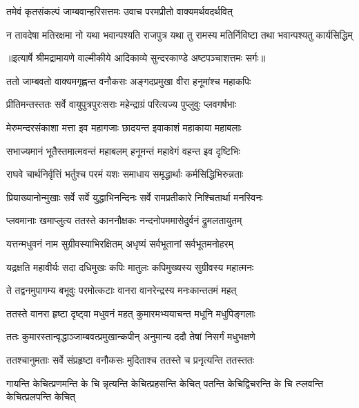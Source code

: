 \twolineshloka
{तमेवं कृतसंकल्पं जाम्बवान्हरिसत्तमः}
{उवाच परमप्रीतो वाक्यमर्थवदर्थवित्} %

\fourlineindentedshloka
{न तावदेषा मतिरक्षमा नो}
{ यथा भवान्पश्यति राजपुत्र}
{यथा तु रामस्य मतिर्निविष्टा}
{ तथा भवान्पश्यतु कार्यसिद्धिम्} %


{॥इत्यार्षे श्रीमद्रामायणे वाल्मीकीये आदिकाव्ये सुन्दरकाण्डे अष्टपञ्चाशत्तमः सर्गः॥}


\twolineshloka
{ततो जाम्बवतो वाक्यमगृह्णन्त वनौकसः}
{अङ्गदप्रमुखा वीरा हनूमांश्च महाकपिः} %

\twolineshloka
{प्रीतिमन्तस्ततः सर्वे वायुपुत्रपुरःसराः}
{महेन्द्राग्रं परित्यज्य पुप्लुवुः प्लवगर्षभाः} %

\twolineshloka
{मेरुमन्दरसंकाशा मत्ता इव महागजाः}
{छादयन्त इवाकाशं महाकाया महाबलाः} %

\twolineshloka
{सभाज्यमानं भूतैस्तमात्मवन्तं महाबलम्}
{हनूमन्तं महावेगं वहन्त इव दृष्टिभिः} %

\twolineshloka
{राघवे चार्थनिर्वृत्तिं भर्तुश्च परमं यशः}
{समाधाय समृद्धार्थाः कर्मसिद्धिभिरुन्नताः} %

\twolineshloka
{प्रियाख्यानोन्मुखाः सर्वे सर्वे युद्धाभिनन्दिनः}
{सर्वे रामप्रतीकारे निश्चितार्था मनस्विनः} %

\twolineshloka
{प्लवमानाः खमाप्लुत्य ततस्ते काननौक्षकः}
{नन्दनोपममासेदुर्वनं द्रुमलतायुतम्} %

\twolineshloka
{यत्तन्मधुवनं नाम सुग्रीवस्याभिरक्षितम्}
{अधृष्यं सर्वभूतानां सर्वभूतमनोहरम्} %

\twolineshloka
{यद्रक्षति महावीर्यः सदा दधिमुखः कपिः}
{मातुलः कपिमुख्यस्य सुग्रीवस्य महात्मनः} %

\twolineshloka
{ते तद्वनमुपागम्य बभूवुः परमोत्कटाः}
{वानरा वानरेन्द्रस्य मनःकान्ततमं महत्} %

\twolineshloka
{ततस्ते वानरा हृष्टा दृष्ट्वा मधुवनं महत्}
{कुमारमभ्ययाचन्त मधूनि मधुपिङ्गलाः} %

\twolineshloka
{ततः कुमारस्तान्वृद्धाञ्जाम्बवत्प्रमुखान्कपीन्}
{अनुमान्य ददौ तेषां निसर्गं मधुभक्षणे} %

\twolineshloka
{ततश्चानुमताः सर्वे संप्रहृष्टा वनौकसः}
{मुदिताश्च ततस्ते च प्रनृत्यन्ति ततस्ततः} %

\fourlineindentedshloka
{गायन्ति केचित्प्रणमन्ति के चि}
{न्नृत्यन्ति केचित्प्रहसन्ति केचित्}
{पतन्ति केचिद्विचरन्ति के चि}
{त्प्लवन्ति केचित्प्रलपन्ति केचित्} %

